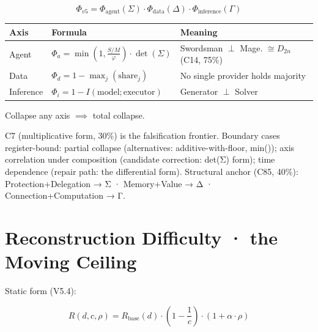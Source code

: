 \documentclass[
]{article}
\newcounter{none} %
\begin{document}
\[\Phi_{v5} = \Phi_{\text{agent}}(\Sigma) \cdot \Phi_{\text{data}}(\Delta) \cdot \Phi_{\text{inference}}(\Gamma)\]

{\def\LTcaptype{none} %
\begin{longtable}[]{@{}
  >{\raggedright\arraybackslash}p{}
  >{\raggedright\arraybackslash}p{}
  >{\raggedright\arraybackslash}p{}@{}}
\toprule\noalign{}
\begin{minipage}[b]{\linewidth}\raggedright
Axis
\end{minipage} & \begin{minipage}[b]{\linewidth}\raggedright
Formula
\end{minipage} & \begin{minipage}[b]{\linewidth}\raggedright
Meaning
\end{minipage} \\
\midrule\noalign{}
\endhead
\bottomrule\noalign{}
\endlastfoot
Agent & \(\Phi_a = \min(1, \frac{S/M}{\varphi}) \cdot \det(\Sigma)\) &
Swordsman \(\perp\) Mage. \(\cong D_{2n}\) (C14, 75\%) \\
Data & \(\Phi_d = 1 - \max_j(\text{share}_j)\) & No single provider
holds majority \\
Inference & \(\Phi_i = 1 - I(\text{model};\text{executor})\) & Generator
\(\perp\) Solver \\
\end{longtable}
}

Collapse any axis \(\implies\) total collapse.

C7 (multiplicative form, 30\%) is the falsification frontier. Boundary
cases register-bound: partial collapse (alternatives:
additive-with-floor, min()); axis correlation under composition
(candidate correction: det(Σ) form); time dependence (repair path: the
differential form). Structural anchor (C85, 40\%): Protection+Delegation
→ Σ · Memory+Value → Δ · Connection+Computation → Γ.

\section{Reconstruction Difficulty · the Moving
Ceiling}\label{reconstruction-difficulty-the-moving-ceiling}

Static form (V5.4):

\[R(d, c, \rho) = R_{\text{base}}(d) \cdot \left(1 - \frac{1}{c}\right) \cdot (1 + \alpha \cdot \rho)\]
\end{document}
